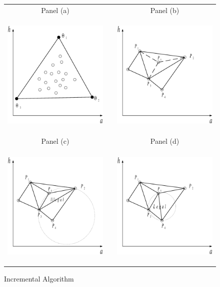 \documentclass[a4paper,12pt]{article}
\begin{document}
\begin{figure}[htb]
	\caption{Incremental Algorithm}
	\label{Delaunay Triangulation Computational}
	\centering
	\begin{tabular}{cC{1cm}c}
	Panel (a) & & Panel (b)  \\
	\includegraphics[height=6.0cm, width=6.0cm]{Abbildungen/Incremental_0.eps} & & \includegraphics[height=6.0cm, width=6.0cm]{Abbildungen/Incremental_1.eps}  \\
	Panel (c) & & Panel (d)  \\
	\includegraphics[height=6.0cm, width=6.0cm]{Abbildungen/Incremental_2.eps} & & \includegraphics[height=6.0cm, width=6.0cm]{Abbildungen/Incremental_3.eps}  \\

\end{tabular}
\end{figure}
\end{document}
